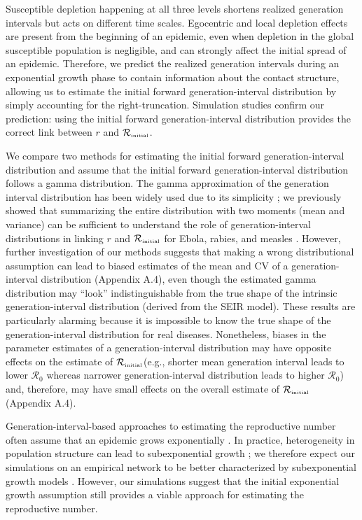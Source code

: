 \documentclass[12pt]{article}
\newcommand{\Rx}[1]{\ensuremath{{\mathcal R}_{#1}}\xspace}
\newcommand{\Ro}{\Rx{0}}
\newcommand{\Rini}{\Rx{\textrm{\tiny initial}}}
\begin{document}
Susceptible depletion happening at all three levels shortens realized generation intervals but acts on different time scales.
Egocentric and local depletion effects are present from the beginning of an epidemic, even when depletion in the global susceptible population is negligible, and can strongly affect the initial spread of an epidemic.
Therefore, we predict the realized generation intervals during an exponential growth phase to contain information about the contact structure, allowing us to estimate the initial forward generation-interval distribution by simply accounting for the right-truncation.
Simulation studies confirm our prediction: using the initial forward generation-interval distribution provides the correct link between $r$ and $\Rini$.

We compare two methods for estimating the initial forward generation-interval distribution and assume that the initial forward generation-interval distribution follows a gamma distribution.
The gamma approximation of the generation interval distribution has been widely used due to its simplicity \citep{mcbryde2009early, nishiura2009transmission, roberts2011early, trichereau2012estimation, nishiura2015theoretical};
we previously showed that summarizing the entire distribution with two moments (mean and variance) can be sufficient to understand the role of generation-interval distributions in linking $r$ and $\Rini$ for Ebola, rabies, and measles \citep{park2019practical}.
However, further investigation of our methods suggests that making a wrong distributional assumption can lead to biased estimates of the mean and CV of a generation-interval distribution (Appendix A.4), even though the estimated gamma distribution may ``look'' indistinguishable from the true shape of the intrinsic generation-interval distribution (derived from the SEIR model).
These results are particularly alarming because it is impossible to know the true shape of the generation-interval distribution for real diseases.
Nonetheless, biases in the parameter estimates of a generation-interval distribution may have opposite effects on the estimate of \Rini (e.g., shorter mean generation interval leads to lower \Ro whereas narrower generation-interval distribution leads to higher \Ro) and, therefore, may have small effects on the overall estimate of $\Rini$ (Appendix A.4).

Generation-interval-based approaches to estimating the reproductive number often assume that an epidemic grows exponentially \citep{wearing2005appropriate, wallinga2007generation, roberts2007model, park2019practical}.
In practice, heterogeneity in population structure can lead to subexponential growth \citep{szendroi2004polynomial, chowell2015western, chowell2016growing, chowell2016characterizing, kiskowski2016modeling, viboud2016generalized};
we therefore expect our simulations on an empirical network to be better characterized by subexponential growth models \citep{viboud2016generalized}.
However, our simulations suggest that the initial exponential growth assumption still provides a viable approach for estimating the reproductive number.
\end{document}

